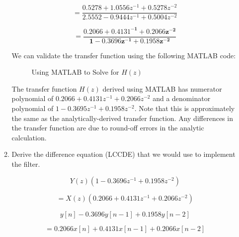 \documentclass[fleqn]{article}
\begin{document}
\begin{enumerate}[nolistsep]
\begin{enumerate}
			\begin{equation*}
				= \frac{0.5278 + 1.0556z^{-1} + 0.5278z^{-2}}{2.5552 - 0.9444z^{-1} + 0.5004z^{-2}}
			\end{equation*}
			
			\begin{equation*}
				\mathbf{= \frac{0.2066 + 0.4131^{-1} + 0.2066z^{-2}}{1 - 0.3696z^{-1} + 0.1958z^{-2}}}
			\end{equation*}
			
			\pagebreak
			We can validate the transfer function using the following MATLAB code:
			
			\begin{figure}[H]
					\centerline{}
					\caption{Using MATLAB to Solve for $H(z)$}
			\end{figure}
			
			The transfer function $H(z)$ derived using MATLAB has numerator polynomial of $0.2066 + 0.4131z^{-1} + 0.2066z^{-2}$ and a denominator polynomial of $1 - 0.3695z^{-1} + 0.1958z^{-2}$. Note that this is approximately the same as the analytically-derived transfer function. Any differences in the transfer function are due to round-off errors in the analytic calculation.
			
			\item Derive the difference equation (LCCDE) that we would use to implement the filter.
			
			\begin{equation*}
				Y(z)(1 - 0.3696z^{-1} + 0.1958z^{-2})
			\end{equation*}
			
			\begin{equation*}			
				= X(z)(0.2066 + 0.4131z^{-1} + 0.2066z^{-2})
			\end{equation*}
			
			\begin{equation*}
				y[n] - 0.3696y[n-1] + 0.1958y[n-2]
			\end{equation*}
			
			\begin{equation*}
				 = 0.2066x[n] + 0.4131x[n-1] + 0.2066x[n-2]
			\end{equation*}
			

\end{enumerate}
\end{enumerate}
\end{document}
